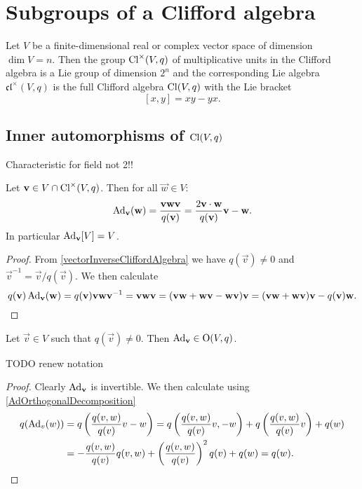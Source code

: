 \section{Subgroups of a Clifford algebra}

\begin{proposition}
Let $V$ be a finite-dimensional real or complex vector space of dimension $\dim V = n$. Then the group $\operatorname{Cl}^\times(V,q)$ of multiplicative units in the Clifford algebra is a Lie group of dimension $2^n$ and the corresponding Lie algebra $\mathfrak{cl}^\times(V,q)$ is the full Clifford algebra $\operatorname{Cl}(V,q)$ with the Lie bracket
\[ [x,y] = xy - yx.  \]
\end{proposition}

\subsection{Inner automorphisms of $\operatorname{Cl}(V,q)$}
Characteristic for field not 2!!


\begin{proposition} \label{AdOrthogonalDecomposition}
Let $\boldsymbol{\mathrm{v}}\in V\cap \operatorname{Cl}^\times(V,q)$. Then for all $\vec{w}\in V$:
\[ \operatorname{Ad}_{\boldsymbol{\mathrm{v}}}(\boldsymbol{\mathrm{w}}) = \frac{\boldsymbol{\mathrm{v}}\boldsymbol{\mathrm{w}}\boldsymbol{\mathrm{v}}}{q(\boldsymbol{\mathrm{v}})} = \frac{2\boldsymbol{\mathrm{v}}\cdot\boldsymbol{\mathrm{w}}}{q(\boldsymbol{\mathrm{v}})}\boldsymbol{\mathrm{v}} - \boldsymbol{\mathrm{w}}. \]
In particular $\operatorname{Ad}_{\boldsymbol{\mathrm{v}}}[V] = V$.
\end{proposition}
\begin{proof}
From \ref{vectorInverseCliffordAlgebra} we have $q(\vec{v})\neq 0$ and $\vec{v}^{-1} = \vec{v}/q(\vec{v})$.
We then calculate
\[ q(\boldsymbol{\mathrm{v}})\operatorname{Ad}_{\boldsymbol{\mathrm{v}}}(\boldsymbol{\mathrm{w}}) = q(\boldsymbol{\mathrm{v}})\boldsymbol{\mathrm{v}}\boldsymbol{\mathrm{w}}\boldsymbol{\mathrm{v}}^{-1} = \boldsymbol{\mathrm{v}}\boldsymbol{\mathrm{w}}\boldsymbol{\mathrm{v}} = (\boldsymbol{\mathrm{v}}\boldsymbol{\mathrm{w}} + \boldsymbol{\mathrm{w}}\boldsymbol{\mathrm{v}} - \boldsymbol{\mathrm{w}}\boldsymbol{\mathrm{v}})\boldsymbol{\mathrm{v}} = (\boldsymbol{\mathrm{v}}\boldsymbol{\mathrm{w}}+\boldsymbol{\mathrm{w}}\boldsymbol{\mathrm{v}})\boldsymbol{\mathrm{v}} - q(\boldsymbol{\mathrm{v}})\boldsymbol{\mathrm{w}}. \]
\end{proof}

\begin{lemma} \label{AdOrthogonalMap}
Let $\vec{v}\in V$ such that $q(\vec{v})\neq 0$. Then $\operatorname{Ad}_{\boldsymbol{\mathrm{v}}}\in \operatorname{O}(V,q)$.
\end{lemma}
TODO renew notation
\begin{proof}
Clearly $\operatorname{Ad}_{\boldsymbol{\mathrm{v}}}$ is invertible. We then calculate using \ref{AdOrthogonalDecomposition}
\begin{align*}
q(\operatorname{Ad}_v(w)) &= q\left(\frac{q(v,w)}{q(v)}v - w\right) = q\left(\frac{q(v,w)}{q(v)}v,-w\right) + q\left(\frac{q(v,w)}{q(v)}v\right) + q(w) \\
&= -\frac{q(v,w)}{q(v)}q(v,w)+\left(\frac{q(v,w)}{q(v)}\right)^2q(v) + q(w) = q(w).
\end{align*}
\end{proof}


